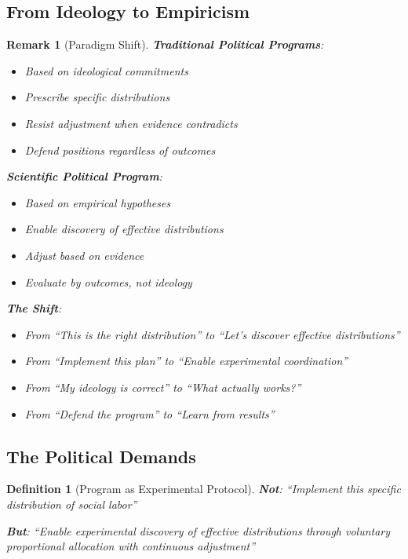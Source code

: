 \documentclass[11pt]{article}
\newtheorem{definition}{Definition}
\newtheorem{remark}{Remark}
\begin{document}
\subsection{From Ideology to Empiricism}

\begin{remark}[Paradigm Shift]
\textbf{Traditional Political Programs}:
\begin{itemize}
\item Based on ideological commitments
\item Prescribe specific distributions
\item Resist adjustment when evidence contradicts
\item Defend positions regardless of outcomes
\end{itemize}

\textbf{Scientific Political Program}:
\begin{itemize}
\item Based on empirical hypotheses
\item Enable discovery of effective distributions
\item Adjust based on evidence
\item Evaluate by outcomes, not ideology
\end{itemize}

\textbf{The Shift}:
\begin{itemize}
\item From ``This is the right distribution'' to ``Let's discover effective distributions''
\item From ``Implement this plan'' to ``Enable experimental coordination''
\item From ``My ideology is correct'' to ``What actually works?''
\item From ``Defend the program'' to ``Learn from results''
\end{itemize}
\end{remark}

\subsection{The Political Demands}

\begin{definition}[Program as Experimental Protocol]
\textbf{Not}: ``Implement this specific distribution of social labor''

\textbf{But}: ``Enable experimental discovery of effective distributions through voluntary proportional allocation with continuous adjustment''
\end{definition}
\end{document}
